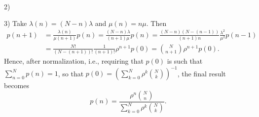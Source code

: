 \begin{question}
\begin{solution}
2) \tbd

3)   Take $\lambda(n) = (N-n)\lambda$ and $\mu(n) = n \mu$. Then 
    \begin{equation*}
      \begin{split}
      p(n+1) 
&= \frac{\lambda(n)}{\mu(n+1)} p(n) 
= \frac{(N-n)\lambda}{(n+1)\mu} p(n) 
= \frac{(N-n)(N-(n-1))}{(n+1)n}\frac{\lambda^2}{\mu^2} p(n-1) \\
&= \frac{N!}{(N-(n+1))!}\frac1{(n+1)!}\rho^{n+1} p(0) 
  = {N \choose n+1}\rho^{n+1} p(0).
      \end{split}
    \end{equation*}
    Hence, after normalization, i.e., requiring that $p(0)$ is such
    that $\sum_{n=0}^N p(n) = 1$, so that $p(0) = \left(\sum_{k=0}^N \rho^k { N \choose k} \right)^{-1}$, the final result becomes
\begin{equation*}
  p(n) = \frac{\rho^n {N \choose n}}{\sum_{k=0}^N \rho^k {N \choose k}}.
\end{equation*}
    \end{solution}
\end{question}



